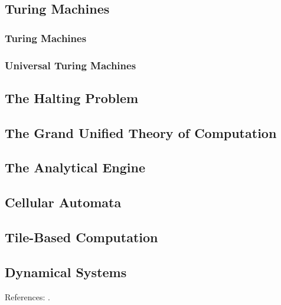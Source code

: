 \documentclass[]{article}
\begin{document}
\subsection{Turing Machines}
\subsubsection{Turing Machines}
\subsubsection{Universal Turing Machines}
\subsection{The Halting Problem}

\subsection{The Grand Unified Theory of Computation}

\subsection{The Analytical Engine}

\subsection{Cellular Automata}

\subsection{Tile-Based Computation}

\subsection{Dynamical Systems} 


References: \cite[Chapter 7]{moore2011nature}.



\printglossaries

 

\raggedright
{}

\end{document}
